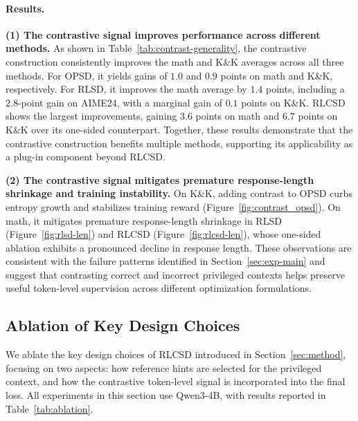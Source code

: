 \paragraph{Results.}

\textbf{(1) The contrastive signal improves performance across different methods.} As shown in Table~\ref{tab:contrast-generality}, the contrastive construction consistently improves the math and K\&K averages across all three methods. For OPSD, it yields gains of $1.0$ and $0.9$ points on math and K\&K, respectively. For RLSD, it improves the math average by $1.4$ points, including a $2.8$-point gain on AIME24, with a marginal gain of $0.1$ points on K\&K. RLCSD shows the largest improvements, gaining $3.6$ points on math and $6.7$ points on K\&K over its one-sided counterpart. Together, these results demonstrate that the contrastive construction benefits multiple methods, supporting its applicability as a plug-in component beyond RLCSD.

\textbf{(2) The contrastive signal mitigates premature response-length shrinkage and training instability.} On K\&K, adding contrast to OPSD curbs entropy growth and stabilizes training reward (Figure~\ref{fig:contrast_opsd}). On math, it mitigates premature response-length shrinkage in RLSD (Figure~\ref{fig:rlsd-len}) and RLCSD (Figure~\ref{fig:rlcsd-len}), whose one-sided ablation exhibits a pronounced decline in response length. These observations are consistent with the failure patterns identified in Section~\ref{sec:exp-main} and suggest that contrasting correct and incorrect privileged contexts helps preserve useful token-level supervision across different optimization formulations.

\subsection{Ablation of Key Design Choices}
\label{sec:exp-ablation}



We ablate the key design choices of RLCSD introduced in Section~\ref{sec:method}, focusing on two aspects: how reference hints are selected for the privileged context, and how the contrastive token-level signal is incorporated into the final loss. All experiments in this section use Qwen3-4B, with results reported in Table~\ref{tab:ablation}.

